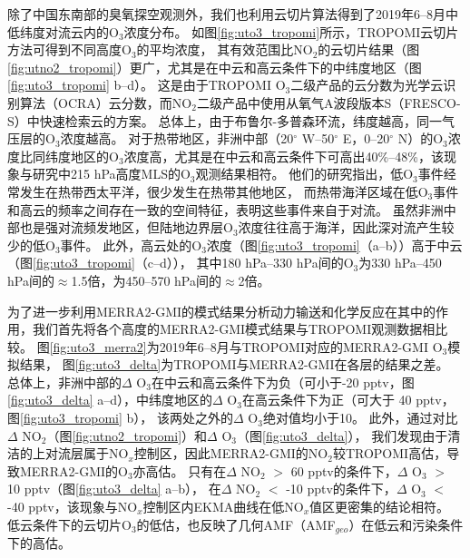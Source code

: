 除了中国东南部的臭氧探空观测外，我们也利用云切片算法得到了2019年6--8月中低纬度对流云内的O$_3$浓度分布。
如图\ref{fig:uto3_tropomi}所示，TROPOMI云切片方法可得到不同高度O$_3$的平均浓度，
其有效范围比NO$_2$的云切片结果（图\ref{fig:utno2_tropomi}）更广，尤其是在中云和高云条件下的中纬度地区（图\ref{fig:uto3_tropomi} b--d）。
这是由于TROPOMI O$_3$二级产品的云分数为光学云识别算法（OCRA）云分数，而NO$_2$二级产品中使用从氧气A波段版本S（FRESCO-S）中快速检索云的方案。
总体上，由于布鲁尔-多普森环流，纬度越高，同一气压层的O$_3$浓度越高。
对于热带地区，非洲中部（20$^{\circ}$ W--50$^{\circ}$ E，0--20$^{\circ}$ N）的O$_3$浓度比同纬度地区的O$_3$浓度高，尤其是在中云和高云条件下可高出40\%--48\%，该现象与\citet{Cooper.2013}研究中215 hPa高度MLS的O$_3$观测结果相符。
他们的研究指出，低O$_3$事件经常发生在热带西太平洋，很少发生在热带其他地区，
而热带海洋区域在低O$_3$事件和高云的频率之间存在一致的空间特征，表明这些事件来自于对流。
虽然非洲中部也是强对流频发地区，但陆地边界层O$_3$浓度往往高于海洋，因此深对流产生较少的低O$_3$事件。
此外，高云处的O$_3$浓度（图\ref{fig:uto3_tropomi}（a--b））高于中云（图\ref{fig:uto3_tropomi}（c--d）），
其中180 hPa--330 hPa间的O$_3$为330 hPa--450 hPa间的$\approx$1.5倍，为450--570 hPa间的$\approx$2倍。

为了进一步利用MERRA2-GMI的模式结果分析动力输送和化学反应在其中的作用，我们首先将各个高度的MERRA2-GMI模式结果与TROPOMI观测数据相比较。
图\ref{fig:uto3_merra2}为2019年6--8月与TROPOMI对应的MERRA2-GMI O$_3$模拟结果，
图\ref{fig:uto3_delta}为TROPOMI与MERRA2-GMI在各层的结果之差。
总体上，非洲中部的$\Delta$ O$_3$在中云和高云条件下为负（可小于-20 pptv，图\ref{fig:uto3_delta} a--d），中纬度地区的$\Delta$ O$_3$在高云条件下为正（可大于 40 pptv，图\ref{fig:uto3_tropomi} b），
该两处之外的$\Delta$ O$_3$绝对值均小于10。
此外，通过对比$\Delta$ NO$_2$（图\ref{fig:utno2_tropomi}）和$\Delta$ O$_3$（图\ref{fig:uto3_delta}），
我们发现由于清洁的上对流层属于NO$_x$控制区\citep{Brown.2022}，因此MERRA2-GMI的NO$_2$较TROPOMI高估，导致MERRA2-GMI的O$_3$亦高估。
只有在$\Delta$ NO$_2$ $>$ 60 pptv的条件下，$\Delta$ O$_3$ $>$ 10 pptv（图\ref{fig:uto3_delta} a--b），
在$\Delta$ NO$_2$ $<$ -10 pptv的条件下，$\Delta$ O$_3$ $<$ -40 pptv，该现象与NO$_x$控制区内EKMA曲线在低NO$_x$值区更密集的结论相符。
低云条件下的云切片O$_3$的低估，也反映了几何AMF（AMF$_{geo}$）在低云和污染条件下的高估\citep{BelmonteRivas.2015}。

